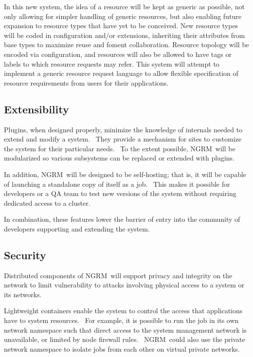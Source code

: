 \documentclass{article}
\newcommand{\ngrm}{NGRM}
\begin{document}
In this new system, the idea of a resource will be kept as generic as
possible, not only allowing for simpler handling of generic resources,
but also enabling future expansion to resource types that have yet to
be conceived. New resource types will be coded in configuration and/or
extensions, inheriting their attributes from base types to maximize reuse
and foment collaboration.  Resource topology will be encoded via
configuration, and resources will also be allowed to have tags or labels
to which resource requests may refer. This system will attempt to
implement a generic resource request language to allow flexible
specification of resource requirements from users for their applications.

\subsection{Extensibility}

Plugins, when designed properly, minimize the knowledge of internals
needed to extend and modify a system.  They provide a mechanism for
sites to customize the system for their particular needs.  To the extent
possible, \ngrm\ will be modularized so various subsystems can be replaced
or extended with plugins.

In addition, \ngrm\ will be designed to be self-hosting; that is, it will
be capable of launching a standalone copy of itself as a job.  This makes
it possible for developers or a QA team to test new versions of the
system without requiring dedicated access to a cluster.

In combination, these features lower the barrier of entry into the
community of developers supporting and extending the system.

\subsection{Security}

Distributed components of \ngrm\ will support privacy and integrity on
the network to limit vulnerability to attacks involving physical access
to a system or its networks.

Lightweight containers enable the system to control the access that
applications have to system resources.  For example, it is possible to
run the job in its own network namespace such that direct access to the
system management network is unavailable, or limited by node firewall
rules.  \ngrm\ could also use the private network namespace to isolate
jobs from each other on virtual private networks.
\end{document}

